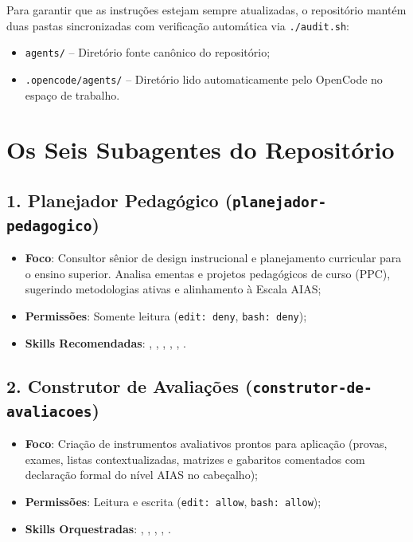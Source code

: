 Para garantir que as instru{\c c}{\~o}es estejam sempre atualizadas, o reposit{\'o}rio mant{\'e}m duas pastas sincronizadas com verifica{\c c}{\~a}o autom{\'a}tica via \texttt{./audit.sh}:
\begin{itemize}
  \item \texttt{agents/} -- Diret{\'o}rio fonte can{\^o}nico do reposit{\'o}rio;
  \item \texttt{.opencode/agents/} -- Diret{\'o}rio lido automaticamente pelo OpenCode no espa{\c c}o de trabalho.
\end{itemize}

\section{Os Seis Subagentes do Reposit{\'o}rio}

\subsection{1. Planejador Pedag{\'o}gico (\texttt{planejador-pedagogico})}
\begin{itemize}
  \item \textbf{Foco}: Consultor s{\^e}nior de design instrucional e planejamento curricular para o ensino superior. Analisa ementas e projetos pedag{\'o}gicos de curso (PPC), sugerindo metodologias ativas e alinhamento {\`a} Escala AIAS;
  \item \textbf{Permiss{\~o}es}: Somente leitura (\texttt{edit: deny}, \texttt{bash: deny});
  \item \textbf{Skills Recomendadas}: , , , , , .
\end{itemize}

\subsection{2. Construtor de Avalia{\c c}{\~o}es (\texttt{construtor-de-avaliacoes})}
\begin{itemize}
  \item \textbf{Foco}: Cria{\c c}{\~a}o de instrumentos avaliativos prontos para aplica{\c c}{\~a}o (provas, exames, listas contextualizadas, matrizes e gabaritos comentados com declara{\c c}{\~a}o formal do n{\'i}vel AIAS no cabe{\c c}alho);
  \item \textbf{Permiss{\~o}es}: Leitura e escrita (\texttt{edit: allow}, \texttt{bash: allow});
  \item \textbf{Skills Orquestradas}: , , , , .
\end{itemize}

